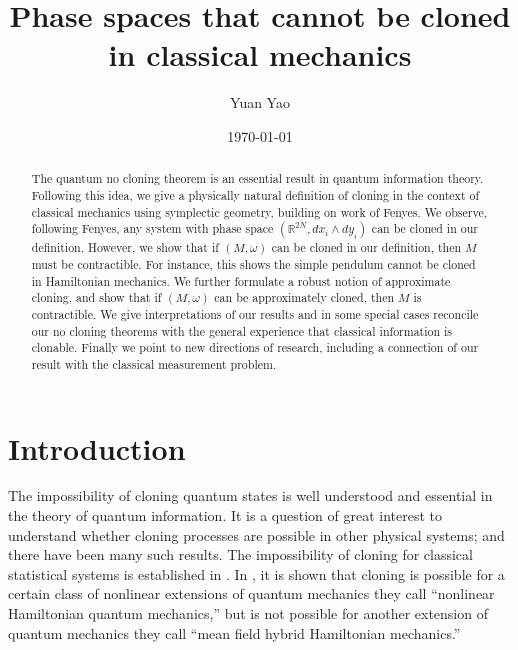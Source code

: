 \documentclass[jmp,amsmath,amssymb]{revtex4-1}
\theoremstyle{plain}
\begin{document}
\title{Phase spaces that cannot be cloned in classical mechanics}
\author{Yuan Yao}

%



\date{\today}
\begin{abstract}
 The quantum no cloning theorem is an essential result in quantum information theory. Following this idea, we give a physically natural definition of cloning in the context of classical mechanics using symplectic geometry, building on work of Fenyes. We observe, following Fenyes, any system with phase space $(\mathbb{R}^{2N}, dx_i\wedge dy_i)$ can be cloned in our definition. However, we show that if $(M,\omega)$ can be cloned in our definition, then $M$ must be contractible. For instance, this shows the simple pendulum cannot be cloned in Hamiltonian mechanics. We further formulate a robust notion of approximate cloning, and show that if $(M, \omega)$ can be approximately cloned, then $M$ is contractible. We give interpretations of our results and in some special cases reconcile our no cloning theorems with the general experience that classical information is clonable. Finally we point to new directions of research, including a connection of our result with the classical measurement problem.
\end{abstract}
\maketitle
\section{Introduction} \label{section:intro}

The impossibility of cloning quantum states is well understood \cite{RevModPhys.77.1225,fenyes} and essential in the theory of quantum information. It is a question of great interest to understand whether cloning processes are possible in other physical systems; and there have been many such results. The impossibility of cloning for classical statistical systems is established in \cite{PhysRevLett.88.210601}. In \cite{Clone_nonlinear_Ham}, it is shown that cloning is possible for a certain class of nonlinear extensions of quantum mechanics they call ``nonlinear Hamiltonian quantum mechanics,'' but is not possible for another extension of quantum mechanics they call ``mean field hybrid Hamiltonian mechanics.''
\end{document}
